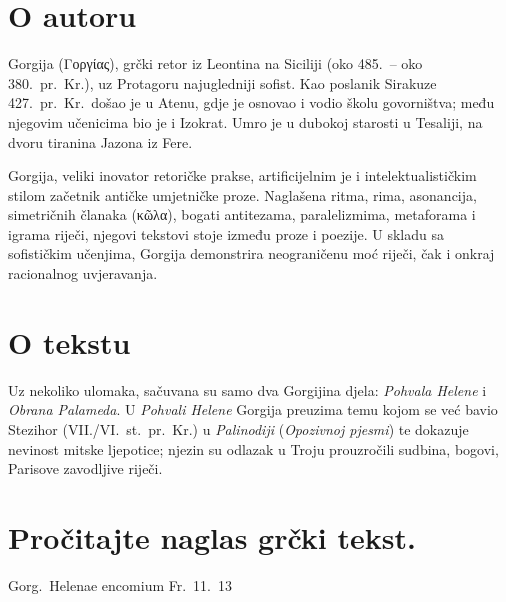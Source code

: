 \section*{O autoru}

Gorgija \textgreek[variant=ancient]{(Γοργίας),} grčki retor iz Leontina na Siciliji (oko 485.\ – oko 380.\ pr.~Kr.), uz Protagoru najugledniji sofist. Kao poslanik Sirakuze 427.\ pr.~Kr.\ došao je u Atenu, gdje je osnovao i vodio školu govorništva; među njegovim učenicima bio je i Izokrat. Umro je u dubokoj starosti u Tesaliji, na dvoru tiranina Jazona iz Fere.

Gorgija, veliki inovator retoričke prakse, artificijelnim je i intelektualističkim stilom začetnik antičke umjetničke proze. Naglašena ritma, rima, asonancija, simetričnih članaka \textgreek[variant=ancient]{(κῶλα),} bogati antitezama, paralelizmima, metaforama i igrama riječi, njegovi tekstovi stoje između proze i poezije. U skladu sa sofističkim učenjima, Gorgija demonstrira neograničenu moć riječi, čak i onkraj racionalnog uvjeravanja.

\section*{O tekstu}

Uz nekoliko ulomaka, sačuvana su samo dva Gorgijina djela: \textit{Pohvala Helene} i \textit{Obrana Palameda}. U \textit{Pohvali Helene} Gorgija preuzima temu kojom se već bavio Stezihor (VII./VI.~st.\ pr.~Kr.) u \textit{Palinodiji} (\textit{Opozivnoj pjesmi}) te dokazuje nevinost mitske ljepotice; njezin su odlazak u Troju prouzročili sudbina, bogovi, Parisove zavodljive riječi.


\section*{Pročitajte naglas grčki tekst.}
Gorg.\ Helenae encomium Fr.~11.~13

\medskip

